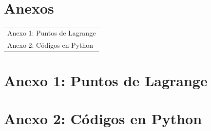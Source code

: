 \documentclass[11pt, oneside]{book}
\begin{document}
\nocite{*}





\backmatter

\chapter*{Anexos}
\vspace*{1cm}

\begin{center}
\begin{tabular}{p{}}
Anexo 1: Puntos de Lagrange \dotfill \pageref{anexo:A} \\
Anexo 2: Códigos en Python \dotfill \pageref{anexo:B} \\
\end{tabular}
\end{center}
\newpage

\hypersetup{pageanchor=false}
\setcounter{page}{1}

\captionsetup{list=no}


\chapter*{Anexo 1: Puntos de Lagrange}\label{anexo:A}


%

\chapter*{Anexo 2: Códigos en Python}\label{anexo:B}

\end{document}
